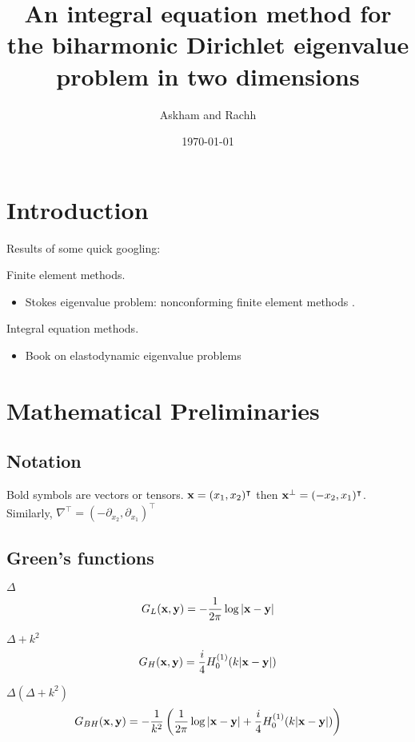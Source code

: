 \documentclass[preprint,12pt]{article}
\title{An integral equation method for the biharmonic
Dirichlet eigenvalue problem in two dimensions}
\author{Askham and Rachh}
\date{\today}
\def\xx{{\bf x}}
\def\yy{{\bf y}}
\begin{document}
\maketitle


\section{Introduction}

Results of some quick googling:

Finite element methods.
\begin{itemize}
\item Stokes eigenvalue problem: nonconforming finite
  element methods \cite{jia2009approximation}.
\end{itemize}

Integral equation methods.
\begin{itemize}
\item Book on elastodynamic eigenvalue problems
  \cite{kitahara2014boundary}
\end{itemize}
\section{Mathematical Preliminaries}

\subsection{Notation}

Bold symbols are vectors or tensors.
$\xx = (x_1,x_2)^\intercal$ then $\xx^\bot = (-x_2,x_1)^\intercal$.
Similarly, $\nabla^\intercal = (-\partial_{x_2},\partial_{x_1})^\intercal$

\subsection{Green's functions}

$\Delta$
\begin{equation}
  G_L(\xx,\yy) = -\frac{1}{2\pi} \log |\xx-\yy|
\end{equation}

$\Delta + k^2$
\begin{equation}
  G_H(\xx,\yy) = \frac{i}{4} H_0^{(1)}(k|\xx-\yy|)
\end{equation}

$\Delta(\Delta + k^2)$
\begin{equation}
  G_{BH}(\xx,\yy) = -\frac{1}{k^2}
  \left (\frac{1}{2\pi} \log |\xx-\yy| +
  \frac{i}{4} H_0^{(1)}(k|\xx-\yy|) \right )
\end{equation}
\end{document}
